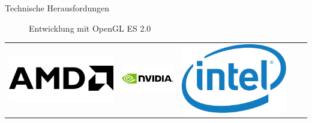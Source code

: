 \begin{frame}{Technische Herausfordungen}
{\begin{figure}
		\caption{Entwicklung mit OpenGL ES 2.0}
	\end{figure}
}
\begin{table}[h]
	\begin{tabular}{c|c|c|c|c}
		\includegraphics[width=\textwidth, height=0.1\textheight, keepaspectratio]{images/AMD_Logo} &
		\includegraphics[width=\textwidth, height=0.1\textheight, keepaspectratio]{images/nvidia-logo} &
		\includegraphics[width=\textwidth, height=0.1\textheight, keepaspectratio]{images/Intel-logo}  &

\end{tabular}
\end{table}
\end{frame}
